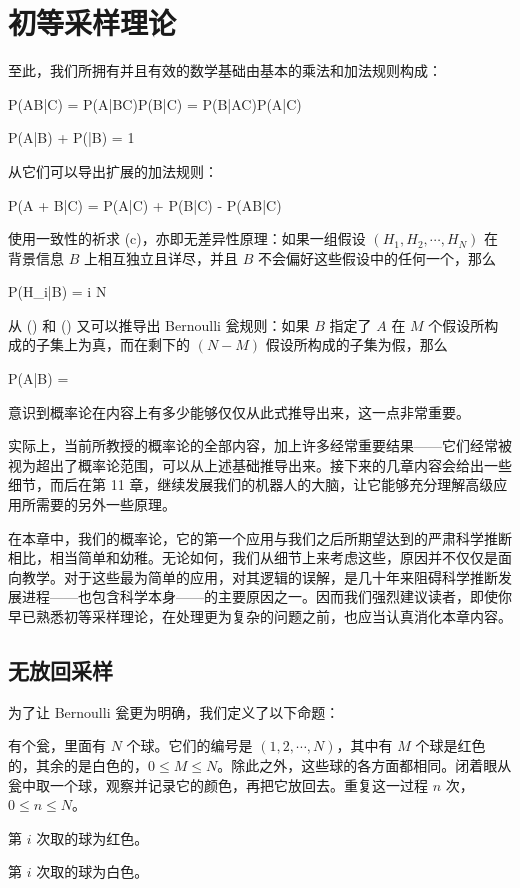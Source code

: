 \chapter[quantitative-rules]{初等采样理论}

至此，我们所拥有并且有效的数学基础由基本的乘法和加法规则构成：

\placeformula[3-1]
\startformula
P(AB|C) = P(A|BC)P(B|C) = P(B|AC)P(A|C)
\stopformula

\placeformula[3-2]
\startformula
P(A|B) + P(|B) = 1
\stopformula

从它们可以导出扩展的加法规则：

\placeformula[3-3]
\startformula
P(A + B|C) = P(A|C) + P(B|C) - P(AB|C)
\stopformula

使用一致性的祈求 (c)，亦即无差异性原理：如果一组假设 $(H_1,H_2,\cdots,H_N)$ 在背景信息 $B$ 上相互独立且详尽，并且 $B$ 不会偏好这些假设中的任何一个，那么

\placeformula[3-4]
\startformula
P(H_i|B) = \quad{}\le i \le N
\stopformula

从 (\in[3-3]) 和 (\in[3-4]) 又可以推导出 Bernoulli 瓮规则：如果 $B$ 指定了 $A$ 在 $M$ 个假设所构成的子集上为真，而在剩下的 $(N - M)$ 假设所构成的子集为假，那么

\placeformula[3-5]
\startformula
P(A|B) = 
\stopformula

意识到概率论在内容上有多少能够仅仅从此式推导出来，这一点非常重要。

实际上，当前所教授的概率论的全部内容，加上许多经常重要结果——它们经常被视为超出了概率论范围，可以从上述基础推导出来。接下来的几章内容会给出一些细节，而后在第 11 章，继续发展我们的机器人的大脑，让它能够充分理解高级应用所需要的另外一些原理。

在本章中，我们的概率论，它的第一个应用与我们之后所期望达到的严肃科学推断相比，相当简单和幼稚。无论如何，我们从细节上来考虑这些，原因并不仅仅是面向教学。对于这些最为简单的应用，对其逻辑的误解，是几十年来阻碍科学推断发展进程——也包含科学本身——的主要原因之一。因而我们强烈建议读者，即使你早已熟悉初等采样理论，在处理更为复杂的问题之前，也应当认真消化本章内容。

\section{无放回采样}

为了让 Bernoulli 瓮更为明确，我们定义了以下命题：

 有个瓮，里面有 $N$ 个球。它们的编号是 $(1,2,\cdots,N)$，其中有 $M$ 个球是红色的，其余的是白色的，$0\le M \le N$。除此之外，这些球的各方面都相同。闭着眼从瓮中取一个球，观察并记录它的颜色，再把它放回去。重复这一过程 $n$ 次，$0\le n \le N$。\par
{} 第 $i$ 次取的球为红色。\par
{} 第 $i$ 次取的球为白色。\par

